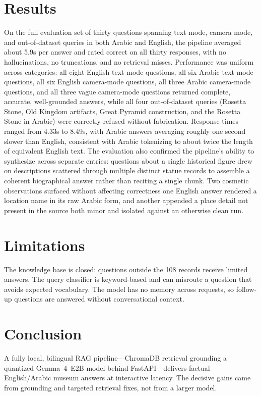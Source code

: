 \section{Results}

On the full evaluation set of thirty questions spanning text mode, camera mode, and
out-of-dataset queries in both Arabic and English, the pipeline averaged about 5.9s
per answer and rated correct on all thirty responses, with no hallucinations, no truncations, 
and no retrieval misses. Performance was uniform across categories: all eight English text-mode questions, 
all six Arabic text-mode questions, all six English camera-mode questions, all three Arabic
camera-mode questions, and all three vague camera-mode questions returned complete, accurate,
well-grounded answers, while all four out-of-dataset queries (Rosetta Stone, Old Kingdom artifacts,
Great Pyramid construction, and the Rosetta Stone in Arabic) were correctly refused
without fabrication. Response times ranged from 4.33s to 8.49s, with Arabic answers
averaging roughly one second slower than English, consistent with Arabic tokenizing to 
about twice the length of equivalent English text. The evaluation also confirmed the pipeline's 
ability to synthesize across separate entries: questions about a single historical figure drew on descriptions
scattered through multiple distinct statue records to assemble a coherent biographical answer rather than
reciting a single chunk. Two cosmetic observations surfaced without affecting correctness  one English 
answer rendered a location name in its raw Arabic form, and another appended a place detail not present
in the source  both minor and isolated against an otherwise clean run.

\section{Limitations}

The knowledge base is closed: questions outside the 108 records receive limited
answers. The query classifier is keyword-based and can misroute a question that avoids
expected vocabulary. The model has no memory across requests, so follow-up questions
are answered without conversational context.

\section{Conclusion}

A fully local, bilingual RAG pipeline---ChromaDB retrieval grounding a quantized
Gemma~4~E2B model behind FastAPI---delivers factual English/Arabic museum answers at
interactive latency. The decisive gains came from grounding and targeted retrieval
fixes, not from a larger model.
